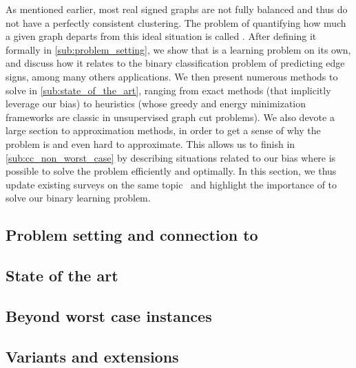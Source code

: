 As mentioned earlier, most real signed graphs are not fully balanced and thus do not have a
perfectly consistent clustering. The problem of quantifying how much a given graph departs from this
ideal situation is called \pcc{}. After defining it formally in \autoref{sub:problem_setting}, we
show that \pcc{} is a learning problem on its own, and discuss how it relates to the binary
classification problem of predicting edge signs, among many others applications. We then present
numerous methods to solve \pcc{} in \autoref{sub:state_of_the_art}, ranging from exact methods (that
implicitly leverage our bias) to heuristics (whose greedy and energy minimization frameworks are
classic in unsupervised graph cut problems). We also devote a large section to approximation
methods, in order to get a sense of why the problem is \NPc{} and even hard to approximate. This
allows us to finish in
\autoref{sub:cc_non_worst_case} by describing situations related to our bias where is possible to
solve the problem efficiently and optimally. In this section, we thus update existing surveys on the same
topic~\autocites{bonchi2014correlation}{surveyCC16}{CCWirth2017} and highlight the importance of
\pcc{} to solve our binary learning problem.


\subsection{Problem setting and connection to \esp{}}
\label{sub:problem_setting}


\subsection{State of the art}
\label{sub:state_of_the_art}



\subsection{Beyond worst case instances}
\label{sub:cc_non_worst_case}



\begin{aside}
\subsection*{Variants and extensions}
\label{sub:variants_and_extensions}

\end{aside}
